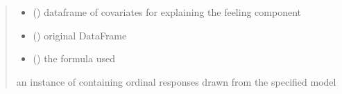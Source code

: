 \documentclass[letterpaper,10pt,english]{sphinxmanual}
\begin{document}
\begin{fulllineitems}
\begin{quote}
\begin{description}
\begin{itemize}
\item {} 
\sphinxAtStartPar
{} () \textendash{} dataframe of covariates for explaining the feeling component

\item {} 
\sphinxAtStartPar
{} () \textendash{} original DataFrame

\item {} 
\sphinxAtStartPar
{} () \textendash{} the formula used

\end{itemize}

\sphinxAtStartPar
an instance of  containing ordinal responses drawn from the specified model

\end{description}\end{quote}

\end{fulllineitems}

\end{document}
